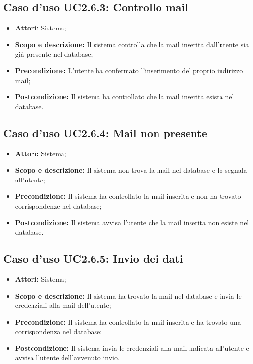 \subsection{Caso d'uso UC2.6.3: Controllo mail}
\begin{itemize}
	\item \textbf{Attori:} Sistema;
	\item \textbf{Scopo e descrizione:} Il sistema controlla che la mail inserita dall'utente sia già presente nel database;
	\item \textbf{Precondizione:} L'utente ha confermato l'inserimento del proprio indirizzo mail;
	\item \textbf{Postcondizione:} Il sistema ha controllato che la mail inserita esista nel database.
\end{itemize}

\subsection{Caso d'uso UC2.6.4: Mail non presente}
\begin{itemize}
	\item \textbf{Attori:} Sistema;
	\item \textbf{Scopo e descrizione:} Il sistema non trova la mail nel database e lo segnala all'utente;
	\item \textbf{Precondizione:} Il sistema ha controllato la mail inserita e non ha trovato corrispondenze nel database;
	\item \textbf{Postcondizione:} Il sistema avvisa l'utente che la mail inserita non esiste nel database.
\end{itemize}

\subsection{Caso d'uso UC2.6.5: Invio dei dati}
\begin{itemize}
	\item \textbf{Attori:} Sistema;
	\item \textbf{Scopo e descrizione:} Il sistema ha trovato la mail nel database e invia le credenziali alla mail dell'utente;
	\item \textbf{Precondizione:} Il sistema ha controllato la mail inserita e ha trovato una corrispondenza nel database;
	\item \textbf{Postcondizione:} Il sistema invia le credenziali alla mail indicata all'utente e avvisa l'utente dell'avvenuto invio.
\end{itemize}

\newpage